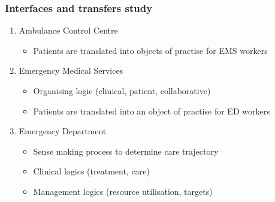 \begin{frame}
    \frametitle{Interfaces and transfers study}

    \begin{enumerate}
        \item Ambulance Control Centre
        \begin{itemize}
            \item Patients are translated into objects of practise for EMS workers
        \end{itemize}
        \item Emergency Medical Services
        \begin{itemize}
            \item Organising logic (clinical, patient, collaborative)
            \item Patients are translated into an object of practise for ED workers
        \end{itemize} 
        \item Emergency Department
        \begin{itemize}
            \item Sense making process to determine care trajectory
            \item Clinical logics (treatment, care)
            \item Management logics (resource utilisation, targets)
        \end{itemize}
    \end{enumerate}

\end{frame}